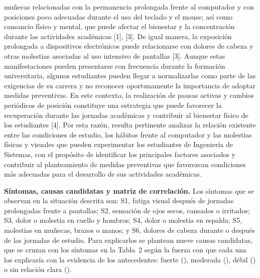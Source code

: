 muñecas relacionadas con la permanencia prolongada frente al computador y con
posiciones poco adecuadas durante el uso del teclado y el mouse; así como cansancio
físico y mental, que puede afectar el bienestar y la concentración durante las
actividades académicas [1], [3]. De igual manera, la exposición prolongada a
dispositivos electrónicos puede relacionarse con dolores de cabeza y otras molestias
asociadas al uso intensivo de pantallas [3]. Aunque estas manifestaciones pueden
presentarse con frecuencia durante la formación universitaria, algunos estudiantes
pueden llegar a normalizarlas como parte de las exigencias de su carrera y no
reconocer oportunamente la importancia de adoptar medidas preventivas. En este
contexto, la realización de pausas activas y cambios periódicos de posición
constituye una estrategia que puede favorecer la recuperación durante las jornadas
académicas y contribuir al bienestar físico de los estudiantes [4]. Por esta razón,
resulta pertinente analizar la relación existente entre las condiciones de estudio,
los hábitos frente al computador y las molestias físicas y visuales que pueden
experimentar los estudiantes de Ingeniería de Sistemas, con el propósito de
identificar los principales factores asociados y contribuir al planteamiento de
medidas preventivas que favorezcan condiciones más adecuadas para el desarrollo de
sus actividades académicas.

\bigskip
\noindent\textbf{Síntomas, causas candidatas y matriz de correlación.} Los síntomas que
se observan en la situación descrita son: S1, fatiga visual después de jornadas
prolongadas frente a pantallas; S2, sensación de ojos secos, cansados o irritados; S3,
dolor o molestia en cuello y hombros; S4, dolor o molestia en espalda; S5, molestias en
muñecas, brazos o manos; y S6, dolores de cabeza durante o después de las jornadas de
estudio. Para explicarlos se plantean nueve causas candidatas, que se cruzan con los
síntomas en la Tabla~2 según la fuerza con que cada una los explicaría con la evidencia
de los antecedentes: fuerte (\cf), moderada (\cm), débil (\cd) o sin relación clara
(\cn).

